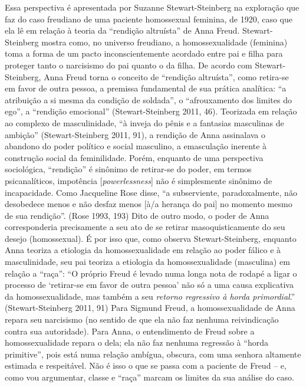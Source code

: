 Essa perspectiva é apresentada por Suzanne Stewart-Steinberg na
exploração que faz do caso freudiano de uma paciente homossexual
feminina, de 1920, caso que ela lê em relação à teoria da ``rendição
altruísta'' de Anna Freud. Stewart-Steinberg mostra como, no universo
freudiano, a homossexualidade (feminina) toma a forma de um pacto
inconscientemente acordado entre pai e filha para proteger tanto o
narcisismo do pai quanto o da filha. De acordo com Stewart-Steinberg,
Anna Freud torna o conceito de ``rendição altruísta'', como retira-se em
favor de outra pessoa, a premissa fundamental de sua prática analítica:
``a atribuição a si mesma da condição de soldada'', o ``afrouxamento dos
limites do ego'', a ``rendição emocional'' (Stewart-Steinberg 2011, 46).
Teorizada em relação ao complexo de masculinidade, ``à inveja do pênis e
a fantasias masculinas de ambição'' (Stewart-Steinberg 2011, 91), a
rendição de Anna assinalava o abandono do poder político e social
masculino, a emasculação inerente à construção social da feminilidade.
Porém, enquanto de uma perspectiva sociológica, ``rendição'' é sinônimo de
retirar-se do poder, em termos psicanalíticos, impotência
{[}\emph{powerlessness}{]} não é simplesmente sinônimo de incapacidade.
Como Jacqueline Rose disse, ``a subserviente, paradoxalmente, não
desobedece menos e não desfaz menos {[}à/a herança do pai{]} no momento
mesmo de sua rendição''. (Rose 1993, 193) Dito de outro modo, o poder de
Anna corresponderia precisamente a seu ato de se retirar
masoquisticamente do seu desejo (homossexual). É por isso que, como
observa Stewart-Steinberg, enquanto Anna teoriza a etiologia da
homossexualidade em relação ao poder fálico e à masculinidade, seu pai
teoriza a etiologia da homossexualidade (masculina) em relação a ``raça'':
``O próprio Freud é levado numa longa nota de rodapé a ligar o processo
de `retirar-se em favor de outra pessoa' não só a uma causa explicativa
da homossexualidade, mas também a seu \emph{retorno regressivo à horda
primordial}.'' (Stewart-Steinberg 2011, 91) Para Sigmund Freud, a
homossexualidade de Anna repara seu narcisismo (no sentido de que ela
não faz nenhuma reivindicação contra sua autoridade). Para Anna, o
entendimento de Freud sobre a homossexualidade repara o dela; ela não
faz nenhuma regressão à ``horda primitive'', pois está numa relação
ambígua, obscura, com uma senhora altamente estimada e respeitável. Não
é isso o que se passa com a paciente de Freud -- e, como vou argumentar,
classe e ``raça'' marcam os limites da sua análise do caso.

